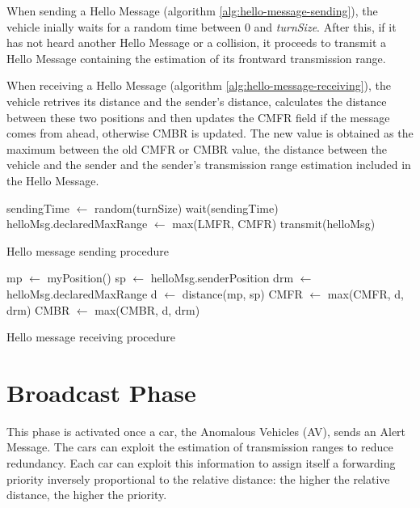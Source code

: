 		When sending a Hello Message (algorithm \ref{alg:hello-message-sending}), the vehicle inially waits for a random time between 0 and \textit{turnSize}. After this, if it has not heard another Hello Message or a collision, it proceeds to transmit a Hello Message containing the estimation of its frontward transmission range.
		
		
		When receiving a Hello Message (algorithm \ref{alg:hello-message-receiving}), the vehicle retrives its distance and the sender's distance, calculates the distance between these two positions and then updates the CMFR field if the message comes from ahead, otherwise CMBR is updated. The new value is obtained as the maximum between the old CMFR or CMBR value, the distance between the vehicle and the sender and the sender's transmission range estimation included in the Hello Message.
		
		\begin{algorithm}[H]
			\begin{algorithmic}[1]
					\State sendingTime $\gets$ random(turnSize)
					\State wait(sendingTime)
						\State helloMsg.declaredMaxRange $\gets$ max(LMFR, CMFR)
						\State transmit(helloMsg)
					\EndIf
				\EndFor
			\end{algorithmic}
			\caption{Hello message sending procedure}
			\label{alg:hello-message-sending}
		\end{algorithm}
		
		\begin{algorithm}[H]
			\begin{algorithmic}[1]
				\State mp $\gets$ myPosition()
				\State sp $\gets$ helloMsg.senderPosition
				\State drm $\gets$ helloMsg.declaredMaxRange
				\State d $\gets$ distance(mp, sp)
				\State CMFR $\gets$ max(CMFR, d, drm)
				\Else
				\State CMBR $\gets$ max(CMBR, d, drm)
				\EndIf
			\end{algorithmic}
			\caption{Hello message receiving procedure}
			\label{alg:hello-message-receiving}
		\end{algorithm}
	
	\section{Broadcast Phase}
		This phase is activated once a car, the Anomalous Vehicles (AV), sends an Alert Message. The cars can exploit the estimation of transmission ranges to reduce redundancy. Each car can exploit this information to assign itself a forwarding priority inversely proportional to the relative distance: the higher the relative distance, the higher the priority.  
		
